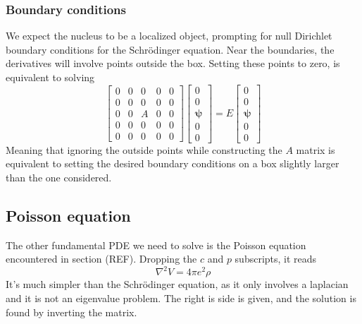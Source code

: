 \subsubsection{Boundary conditions}
We expect the nucleus to be a localized object, prompting for null Dirichlet boundary conditions for the Schr\"odinger equation.
Near the boundaries, the derivatives will involve points outside the box. Setting these points to zero, is equivalent to solving 
\begin{equation}
    \begin{bmatrix}
        0 & 0 & 0 & 0 & 0
        \\0 & 0 & 0 & 0 & 0
        \\0 & 0 & A & 0 & 0
        \\0 & 0 & 0 & 0 & 0
        \\0 & 0 & 0 & 0 & 0
    \end{bmatrix}
    \begin{bmatrix}
        0\\0\\\mathbf{\psi}\\0\\0
    \end{bmatrix}
    = E 
    \begin{bmatrix}
        0\\0\\\mathbf{\psi}\\0\\0
    \end{bmatrix}
\end{equation}
Meaning that ignoring the outside points while constructing the $A$ matrix is equivalent to setting the desired boundary conditions on a box slightly larger than the one considered.
\subsection{Poisson equation}
\label{subsec:poisson}
The other fundamental PDE we need to solve is the Poisson equation encountered in section (REF). Dropping the $c$ and $p$ subscripts, it reads
\begin{equation*}
\nabla^2 V = 4\pi e^2 \rho
\end{equation*}
It's much simpler than the Schr\"odinger equation, as it only involves a laplacian and it is not an eigenvalue problem. The right is side is given, and the solution is found by inverting the matrix.
